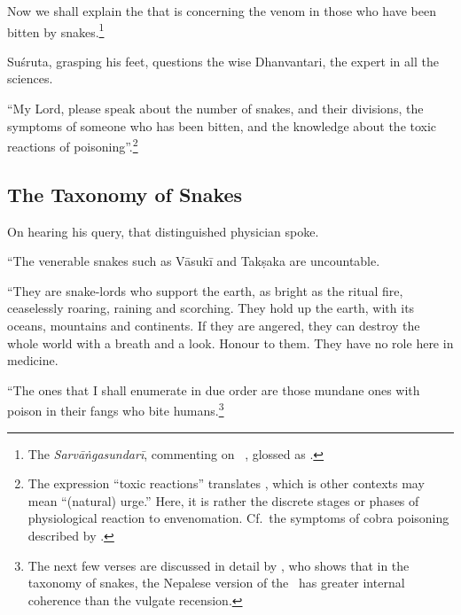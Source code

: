 \begin{translation}
    
    \item[1] 
    
Now we shall explain the  that is
 concerning the venom in those who
have been bitten by snakes.\footnote{\label{arunadatta:kalpa}The
    \emph{Sarvāṅgasundarī}, commenting on \AH\ , glossed
     as .}
    
\item[3] 
    
Suśruta, grasping his feet, questions the wise Dhanvantari, the expert
in all the sciences.

\item[4]
    
“My Lord, please speak about the number of snakes, and their
divisions, the symptoms of someone who has been bitten, and the
knowledge about the toxic reactions of
poisoning”.\footnote{The expression “toxic reactions” translates
    , which is other contexts may mean “(natural) urge.”  Here,
    it is rather the discrete stages or phases of physiological reaction
    to envenomation.  Cf.\ the symptoms of cobra poisoning described by
    \citet[80]{wall-1913}.}
        
        
\subsection{The Taxonomy of Snakes}
        
    \item[5]
    
    On hearing his query, that distinguished physician spoke.
    
    “The venerable snakes such as Vāsukī and Takṣaka are uncountable. 
    
\item[6--9ab]

“They are snake-lords who support the earth, as bright as the ritual fire,
ceaselessly roaring, raining and scorching. They hold up the earth, with its
oceans, mountains and continents. If they are angered, they can destroy the
whole world with a breath and a look.  Honour to them. They have no role
here in medicine.

“The ones that I shall enumerate in due order are those mundane
ones with poison in their fangs who bite humans.\footnote{The next few
    verses are discussed in detail by \citet[101--104]{hari-2011}, who shows
    that in the taxonomy of snakes, the Nepalese version of the \SS\ has greater
    internal coherence than the vulgate recension.}


\end{translation}

